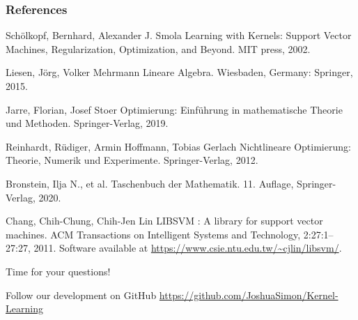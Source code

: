 \documentclass{beamer}
\begin{document}
\begin{frame}
    \frametitle{References}
    \footnotesize{
        \begin{thebibliography}{99} %
             Schölkopf, Bernhard, Alexander J. Smola
            \newblock Learning with Kernels: Support Vector Machines, Regularization, Optimization, and Beyond. MIT press, 2002.

             Liesen, Jörg, Volker Mehrmann
            \newblock Lineare Algebra. Wiesbaden, Germany: Springer, 2015.

             Jarre, Florian, Josef Stoer
            \newblock Optimierung: Einführung in mathematische Theorie und Methoden. Springer-Verlag, 2019.

             Reinhardt, Rüdiger, Armin Hoffmann, Tobias Gerlach
            \newblock Nichtlineare Optimierung: Theorie, Numerik und Experimente. Springer-Verlag, 2012.

              Bronstein, Ilja N., et al. 
            \newblock Taschenbuch der Mathematik. 11. Auflage, Springer-Verlag, 2020.

             Chang, Chih-Chung, Chih-Jen Lin
            \newblock LIBSVM : A library for support vector machines. ACM Transactions on Intelligent Systems and Technology, 2:27:1--27:27, 2011. Software available at \url{https://www.csie.ntu.edu.tw/~cjlin/libsvm/}.

        \end{thebibliography}
    }
\end{frame}


\begin{frame}
    \Huge{\centerline{Time for your questions!}}
    \bigskip
    \bigskip
    \bigskip
    \bigskip

    \normalsize
    \centering
    Follow our development on GitHub  
    \url{https://github.com/JoshuaSimon/Kernel-Learning}
    
\end{frame}

\end{document}
